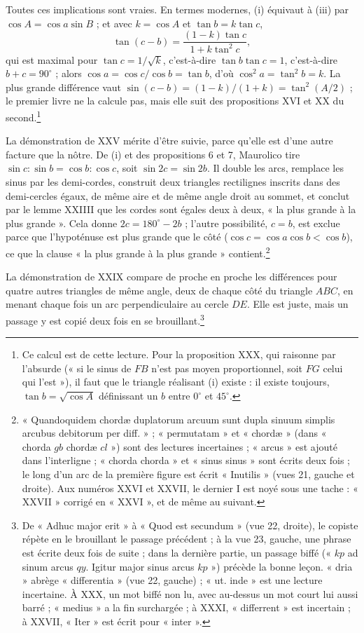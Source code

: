 \documentclass[11pt,a4paper]{article}
\begin{document}
Toutes ces implications sont vraies. En termes modernes, (i) équivaut à (iii)
par $\cos A = \cos a\sin B$ ; et avec $k = \cos A$ et $\tan b = k\tan c$,
\[
\tan(c-b) = \frac{(1-k)\tan c}{1 + k\tan^2 c},
\]
qui est maximal pour $\tan c = 1/\sqrt k$, c'est-à-dire $\tan b\tan c = 1$,
c'est-à-dire $b + c = 90^\circ$ ; alors $\cos a = \cos c/\cos b = \tan b$, d'où
$\cos^2 a = \tan^2 b = k$. La plus grande différence vaut
$\sin(c-b) = (1-k)/(1+k) = \tan^2(A/2)$ ; le premier livre ne la calcule pas, mais
elle suit des propositions XVI et XX du second.\footnote{Ce calcul est de cette
lecture. Pour la proposition XXX, qui raisonne par l'absurde (« si le sinus de
$FB$ n'est pas moyen proportionnel, soit $FG$ celui qui l'est »), il faut que le
triangle réalisant (i) existe : il existe toujours, $\tan b = \sqrt{\cos A}$
définissant un $b$ entre $0^\circ$ et $45^\circ$.}

La démonstration de XXV mérite d'être suivie, parce qu'elle est d'une autre
facture que la nôtre. De (i) et des propositions 6 et 7, Maurolico tire
$\sin c : \sin b = \cos b : \cos c$, soit $\sin 2c = \sin 2b$. Il double les arcs,
remplace les sinus par les demi-cordes, construit deux triangles rectilignes
inscrits dans des demi-cercles égaux, de même aire et de même angle droit au
sommet, et conclut par le lemme XXIIII que les cordes sont égales deux à deux,
« la plus grande à la plus grande ». Cela donne $2c = 180^\circ - 2b$ ; l'autre
possibilité, $c = b$, est exclue parce que l'hypoténuse est plus grande que le
côté ($\cos c = \cos a\cos b < \cos b$), ce que la clause « la plus grande à la
plus grande » contient.\footnote{« Quandoquidem chordæ duplatorum arcuum sunt
dupla sinuum simplis arcubus debitorum per diff. » ; « permutatam » et
« chordæ » (dans « chorda $gb$ chordæ $cl$ ») sont des lectures incertaines ;
« arcus » est ajouté dans l'interligne ; « chorda chorda » et « sinus sinus » sont
écrits deux fois ; le long d'un arc de la première figure est écrit « Inutilis »
(vues 21, gauche et droite). Aux numéros XXVI et XXVII, le dernier I est noyé
sous une tache : « XXVII » corrigé en « XXVI », et de même au suivant.}

La démonstration de XXIX compare de proche en proche les différences pour quatre
autres triangles de même angle, deux de chaque côté du triangle $ABC$, en menant
chaque fois un arc perpendiculaire au cercle $DE$. Elle est juste, mais un passage
y est copié deux fois en se brouillant.\footnote{De « Adhuc major erit » à « Quod
est secundum » (vue 22, droite), le copiste répète en le brouillant le passage
précédent ; à la vue 23, gauche, une phrase est écrite deux fois de suite ; dans
la dernière partie, un passage biffé (« $kp$ ad sinum arcus $qy$. Igitur major
sinus arcus $kp$ ») précède la bonne leçon. « dria » abrège « differentia »
(vue 22, gauche) ; « ut. inde » est une lecture incertaine. À XXX, un mot biffé
non lu, avec au-dessus un mot court lui aussi barré ; « medius » a la fin
surchargée ; à XXXI, « differrent » est incertain ; à XXVII, « Iter » est écrit
pour « inter ».}
\end{document}
